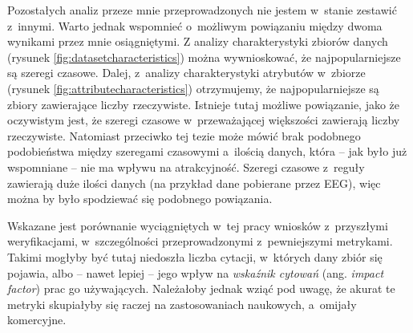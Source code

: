 Pozostałych analiz przeze mnie przeprowadzonych nie jestem w~stanie zestawić z~innymi.
Warto jednak wspomnieć o~możliwym powiązaniu między dwoma wynikami przez mnie osiągniętymi.
Z analizy charakterystyki zbiorów danych (rysunek \ref{fig:datasetcharacteristics}) można wywnioskować, że najpopularniejsze są szeregi czasowe.
Dalej, z~analizy charakterystyki atrybutów w~zbiorze (rysunek \ref{fig:attributecharacteristics}) otrzymujemy, że najpopularniejsze są zbiory zawierające liczby rzeczywiste.
Istnieje tutaj możliwe powiązanie, jako że oczywistym jest, że szeregi czasowe w~przeważającej większości zawierają liczby rzeczywiste.
Natomiast przeciwko tej tezie może mówić brak podobnego podobieństwa między szeregami czasowymi a~ilością danych, która -- jak było już wspomniane -- nie ma wpływu na atrakcyjność.
Szeregi czasowe z~reguły zawierają duże ilości danych (na przykład dane pobierane przez EEG), więc można by było spodziewać się podobnego powiązania.

Wskazane jest porównanie wyciągniętych w~tej pracy wniosków z~przyszłymi weryfikacjami, w~szczególności przeprowadzonymi z~pewniejszymi metrykami.
Takimi mogłyby być tutaj niedoszła liczba cytacji, w~których dany zbiór się pojawia, albo -- nawet lepiej -- jego wpływ na \emph{wskaźnik cytowań} (ang. \emph{impact factor}) prac go używających.
Należałoby jednak wziąć pod uwagę, że akurat te metryki skupiałyby się raczej na zastosowaniach naukowych, a~omijały komercyjne.
